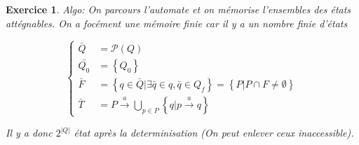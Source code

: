 \documentclass{article}
\theoremstyle{plain}
\newtheorem{exo}{Exercice}%
\begin{document}
\begin{exo}
  Algo: On parcours l'automate et on mémorise l'ensembles 
  des états attégnables. On a focément une mémoire finie 
  car il y a un nombre finie d'états

  \[
    \begin{cases}
      \bar{Q} &= \mathcal{P}(Q) \\
      \bar{Q_0} &= \left\{Q_0\right\} \\
      \bar{F} &= \left\{q \in \bar{Q} | \exists \bar{q} \in q, \bar{q}
           \in Q_f \right\} = \left\{P | P \cap F \neq \emptyset \right\} \\
      \bar{T} &= P \overset{a}{\to} \bigcup_{p \in P} 
                \left\{q | p \overset{a}{\to} q\right\}
    \end{cases}
  \]

  Il y a donc $2^{|Q|}$ état après la determinisation
      (On peut enlever ceux inaccessible).
\end{exo}
\end{document}
